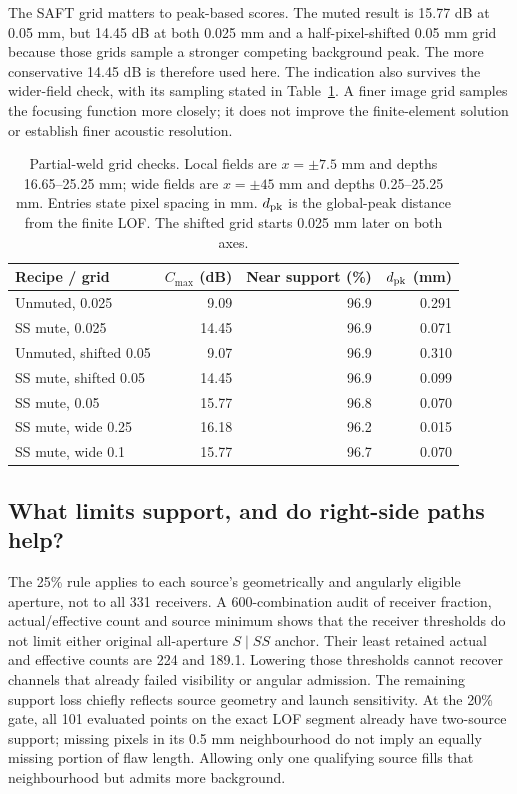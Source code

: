 The SAFT grid matters to peak-based scores. The muted result is 15.77 dB at 0.05 mm, but 14.45 dB at both 0.025 mm and a half-pixel-shifted 0.05 mm grid because those grids sample a stronger competing background peak. The more conservative 14.45 dB is therefore used here. The indication also survives the wider-field check, with its sampling stated in Table~\ref{saftapp:review_grid}. A finer image grid samples the focusing function more closely; it does not improve the finite-element solution or establish finer acoustic resolution.

\begin{table}[!htbp]\centering\small
\caption{Partial-weld grid checks. Local fields are $x=\pm7.5$ mm and depths 16.65--25.25 mm; wide fields are $x=\pm45$ mm and depths 0.25--25.25 mm. Entries state pixel spacing in mm. $d_{\rm pk}$ is the global-peak distance from the finite LOF. The shifted grid starts 0.025 mm later on both axes.}
\label{saftapp:review_grid}
\begin{tabular}{@{}lrrr@{}}\toprule
Recipe / grid & $C_{\max}$ (dB) & Near support (\%) & $d_{\rm pk}$ (mm)\\\midrule
Unmuted, 0.025 & 9.09 & 96.9 & 0.291\\
SS mute, 0.025 & 14.45 & 96.9 & 0.071\\
Unmuted, shifted 0.05 & 9.07 & 96.9 & 0.310\\
SS mute, shifted 0.05 & 14.45 & 96.9 & 0.099\\
SS mute, 0.05 & 15.77 & 96.8 & 0.070\\
SS mute, wide 0.25 & 16.18 & 96.2 & 0.015\\
SS mute, wide 0.1 & 15.77 & 96.7 & 0.070\\
\bottomrule\end{tabular}\end{table}

\subsection{What limits support, and do right-side paths help?}
The 25\% rule applies to each source's geometrically and angularly eligible aperture, not to all 331 receivers. A 600-combination audit of receiver fraction, actual/effective count and source minimum shows that the receiver thresholds do not limit either original all-aperture $S\mid SS$ anchor. Their least retained actual and effective counts are 224 and 189.1. Lowering those thresholds cannot recover channels that already failed visibility or angular admission. The remaining support loss chiefly reflects source geometry and launch sensitivity. At the 20\% gate, all 101 evaluated points on the exact LOF segment already have two-source support; missing pixels in its 0.5 mm neighbourhood do not imply an equally missing portion of flaw length. Allowing only one qualifying source fills that neighbourhood but admits more background.

